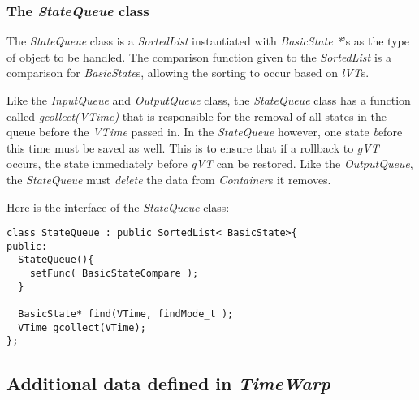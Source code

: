\documentclass[11pt]{report}
\begin{document}
\subsubsection{The {\it StateQueue} class}

The {\it StateQueue} class is a {\it SortedList} instantiated with {\it
BasicState *}'s as the type of object to be handled. The comparison
function given to the {\it SortedList} is a comparison for {\it
BasicState}s, allowing the sorting to occur based on {\it lVT}s.

Like the {\it InputQueue} and {\it OutputQueue} class, the {\it
StateQueue} class has a function called {\it gcollect(VTime)} that is
responsible for the removal of all states in the queue before the {\it
VTime} passed in.  In the {\it StateQueue} however, one state
{\emph before} this time must be saved as well.  This is to ensure that
if a rollback to {\it gVT} occurs, the state immediately before {\it gVT}
can be restored.  Like the {\it OutputQueue}, the {\it StateQueue} must
{\it delete} the data from {\it Container}s it removes.

Here is the interface of the {\it StateQueue} class:

\begin{verbatim}
class StateQueue : public SortedList< BasicState>{
public:
  StateQueue(){
    setFunc( BasicStateCompare );
  }

  BasicState* find(VTime, findMode_t );
  VTime gcollect(VTime);
};
\end{verbatim}

\subsection{Additional data defined in {\it TimeWarp}}
\end{document}
